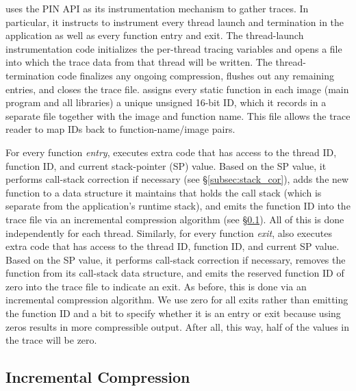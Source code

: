 \parlot uses the PIN API as its instrumentation mechanism to gather traces. In particular, it instructs \pin to instrument every thread launch and termination in the application as well as every function entry and exit. The thread-launch instrumentation code initializes the per-thread tracing variables and opens a file into which the trace data from that thread will be written. The thread-termination code finalizes any ongoing compression, flushes out any remaining entries, and closes the trace file. \parlot assigns every static function in each image (main program and all libraries) a unique unsigned 16-bit ID, which it records in a separate file together with the image and function name. This file allows the trace reader to map IDs back to function-name/image pairs.

For every function \emph{entry}, \parlot executes extra code that has access to the thread ID, function ID, and current stack-pointer (SP) value. Based on the SP value, it performs call-stack correction if necessary (see \S\ref{subsec:stack_cor}), adds the new function to a data structure it maintains that holds the call stack (which is separate from the application's runtime stack), and emits the function ID into the trace file via an incremental compression algorithm (see \S\ref{subsec:incr-compr}). All of this is done independently for each thread. Similarly, for every function \emph{exit}, \parlot also executes extra code that has access to the thread ID, function ID, and current SP value. Based on the SP value, it performs call-stack correction if necessary, removes the function from its call-stack data structure, and emits the reserved function ID of zero into the trace file to indicate an exit. As before, this is done via an incremental compression algorithm. We use zero for all exits rather than emitting the function ID and a bit to specify whether it is an entry or exit because using zeros results in more compressible output. After all, this way, half of the values in the trace will be zero.





\subsection{Incremental Compression}
\label{subsec:incr-compr}

